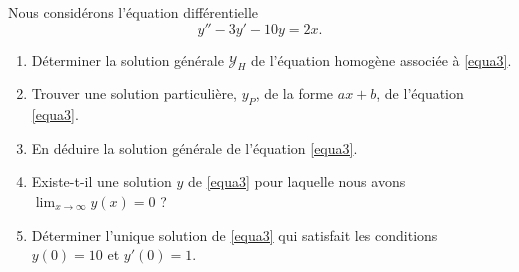 \begin{exercice}\label{sujetjanvier2016ODE3}


Nous considérons l'équation différentielle
\begin{equation}\label{equa3}
y''-3y'-10y=2x.
\end{equation}

\begin{enumerate}

\item

Déterminer la solution générale $\mathcal{Y}_H$ de l'équation homogène associée à \eqref{equa3}.

\item

Trouver une solution particulière, $y_P$, de la forme $ax+b$, de l'équation  \eqref{equa3}.

\item

En déduire la solution générale de l'équation \eqref{equa3}.

\item

Existe-t-il une solution $y$ de \eqref{equa3} pour laquelle nous avons $\lim_{x\to\infty}y(x)=0$ ? 

\item

Déterminer l'unique solution de \eqref{equa3} qui satisfait les conditions $y(0)=10$ et $y'(0)=1$.
\end{enumerate}

\end{exercice}
